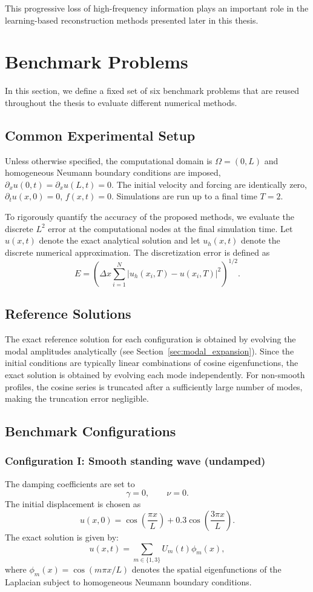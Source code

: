 \documentclass{Configuration_Files/PoliMi3i_thesis}
\newif\ifshowthesischanges
\DeclareRobustCommand{\thesischange}[2]{%
    \ifshowthesischanges
        \textcolor{#1}{#2}%
    \else
        #2%
    \fi
}
\def\thesischange#1#2{#2}%
\begin{document}
This progressive loss of high-frequency information plays an important role in the learning-based reconstruction methods presented later in this thesis.

\section{Benchmark Problems}
\label{sec:benchmark_problems}
In this section, we define a fixed set of six benchmark problems that are reused throughout the thesis to evaluate different numerical methods.

\subsection{Common Experimental Setup}
Unless otherwise specified, the computational domain is $\Omega=(0,L)$ and homogeneous Neumann boundary conditions are imposed, $\partial_xu(0,t)=\partial_xu(L,t)=0$. The initial velocity and forcing are identically zero, $\partial_tu(x,0)=0$, $f(x,t)=0$. Simulations are run up to a final time $T=2$.

To rigorously quantify the accuracy of the proposed methods, we evaluate the discrete $L^2$ error at the computational nodes at the final simulation time. Let $u(x,t)$ denote the exact analytical solution and let $u_h(x,t)$ denote the discrete numerical approximation. The discretization error is defined as
\[
E
=
\left(
\Delta x
\sum_{i=1}^N
|u_h(x_i,T)-u(x_i,T)|^2
\right)^{1/2}.
\]

\subsection{Reference Solutions}
The exact reference solution for each configuration is obtained by evolving the modal amplitudes analytically (see Section~\ref{sec:modal_expansion}). Since the initial conditions are typically linear combinations of cosine eigenfunctions, the exact solution is obtained by evolving each mode independently. For non-smooth profiles, the cosine series is truncated after a sufficiently large number of modes, making the truncation error negligible.

\subsection{Benchmark Configurations}
\subsubsection{Configuration I: Smooth standing wave (undamped)}
The damping coefficients are set to
\[
\gamma=0,\qquad \nu=0.
\]
The initial displacement is chosen as
\[
u(x,0)
=
\cos\!\left(\frac{\pi x}{L}\right)
+
0.3\cos\!\left(\frac{3\pi x}{L}\right).
\]
The exact solution is given by:
\[
u(x,t)
=
\sum_{m\in\{1,3\}}
U_m(t)\phi_m(x),
\]
\thesischange{blue}{where $\phi_m(x) = \cos(m\pi x / L)$ denotes the spatial eigenfunctions of the Laplacian subject to homogeneous Neumann boundary conditions.}
\end{document}
